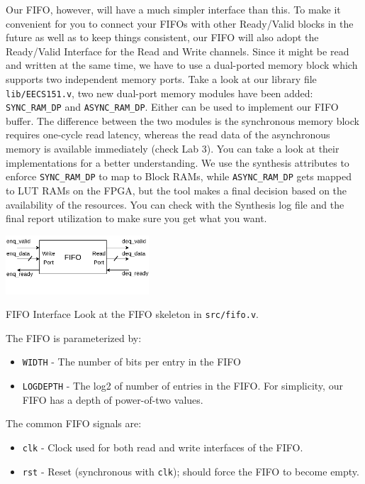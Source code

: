 \documentclass[11pt]{article}
\makeatletter
\renewcommand{\subsection}
{\@startsection {subsection}{1}{0pt}
 {-1ex}
 {0.5ex}
 {\bfseries\normalsize}}
\makeatother
\begin{document}
Our FIFO, however, will have a much simpler interface than this. To make it convenient for you to connect your FIFOs with other Ready/Valid blocks in the future as well as to keep things consistent, our FIFO will also adopt the Ready/Valid Interface for the Read and Write channels. Since it might be read and written at the same time, we have to use a dual-ported memory block which supports two independent memory ports. Take a look at our library file \verb|lib/EECS151.v|, two new dual-port memory modules have been added: \verb|SYNC_RAM_DP| and \verb|ASYNC_RAM_DP|. Either can be used to implement our FIFO buffer. The difference between the two modules is the synchronous memory block requires one-cycle read latency, whereas the read data of the asynchronous memory is available immediately (check Lab 3). You can take a look at their implementations for a better understanding. We use the synthesis attributes to enforce \verb|SYNC_RAM_DP| to map to Block RAMs, while \verb|ASYNC_RAM_DP| gets mapped to LUT RAMs on the FPGA, but the tool makes a final decision based on the availability of the resources. You can check with the Synthesis log file and the final report utilization to make sure you get what you want.


\begin{center}
\includegraphics[width=0.4\textwidth]{figs/fifo.png}
\end{center}

\subsection{FIFO Interface}
Look at the FIFO skeleton in \verb|src/fifo.v|.

The FIFO is parameterized by:
\begin{itemize}
    \item \verb|WIDTH|    - The number of bits per entry in the FIFO
    \item \verb|LOGDEPTH| - The log2 of number of entries in the FIFO. For simplicity, our FIFO has a depth of power-of-two values.
\end{itemize}

The common FIFO signals are:
\begin{itemize}
    \item \verb|clk| - Clock used for both read and write interfaces of the FIFO.
    \item \verb|rst| - Reset (synchronous with \verb|clk|); should force the FIFO to become empty.
\end{itemize}
\end{document}
